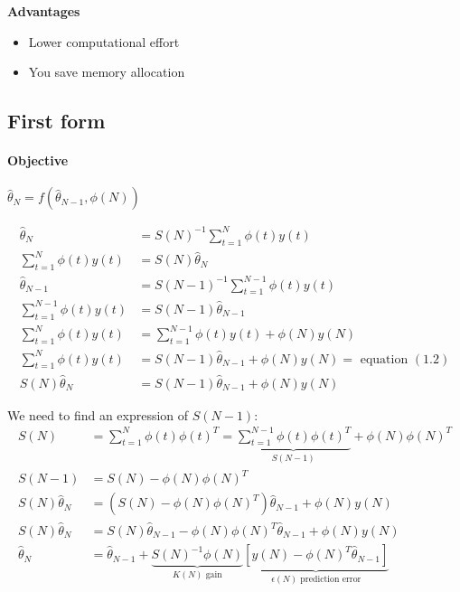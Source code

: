 \textbf{Advantages}
\begin{itemize}
    \item Lower computational effort
    \item You save memory allocation
\end{itemize}

\subsection{First form}

\paragraph{Objective} $\hat{\theta}_N = f(\hat{\theta}_{N-1}, \phi(N))$

\begin{align}
    \hat{\theta}_N &= S(N)^{-1} \sum_{t=1}^N \phi(t)y(t) \\
    \sum_{t=1}^N \phi(t)y(t) &= S(N)\hat{\theta}_N \\
    \hat{\theta}_{N-1} &= S(N-1)^{-1} \sum_{t=1}^{N-1} \phi(t)y(t) \\
    \sum_{t=1}^{N-1} \phi(t)y(t) &= S(N-1)\hat{\theta}_{N-1} \\
    \sum_{t=1}^{N} \phi(t)y(t) &= \sum_{t=1}^{N-1} \phi(t)y(t) + \phi(N)y(N) \\
    \sum_{t=1}^{N} \phi(t)y(t) &= S(N-1)\hat{\theta}_{N-1} + \phi(N)y(N) = \text{ equation } (1.2) \\
    S(N) \hat{\theta}_N &= S(N-1) \hat{\theta}_{N-1} + \phi(N)y(N)
\end{align}

We need to find an expression of $S(N-1)$:
\begin{align*}
    S(N) &= \sum_{t=1}^N \phi(t)\phi(t)^T = \underbrace{\sum_{t=1}^{N-1} \phi(t)\phi(t)^T}_{S(N-1)} + \phi(N)\phi(N)^T \\
    S(N-1) &= S(N) - \phi(N)\phi(N)^T \\
    S(N)\hat{\theta}_N &= \left( S(N) - \phi(N)\phi(N)^T \right)\hat{\theta}_{N-1} + \phi(N)y(N) \\
    S(N)\hat{\theta}_N &= S(N)\hat{\theta}_{N-1} - \phi(N)\phi(N)^T\hat{\theta}_{N-1} + \phi(N)y(N) \\
    \hat{\theta}_N &= \hat{\theta}_{N-1} + \underbrace{S(N)^{-1}\phi(N)}_{K(N)\text{ gain}}\underbrace{\left[ y(N) - \phi(N)^T\hat{\theta}_{N-1} \right]}_{\epsilon(N) \text{ prediction error}}
\end{align*}

